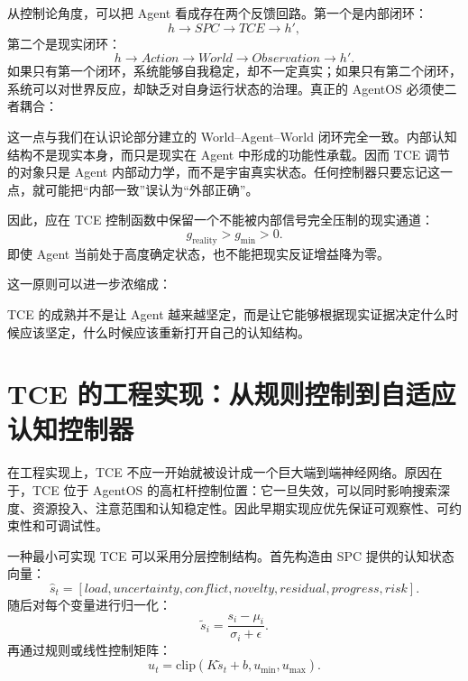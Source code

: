 从控制论角度，可以把 Agent 看成存在两个反馈回路。第一个是内部闭环：
\begin{equation}
    h
    \rightarrow
    SPC
    \rightarrow
    TCE
    \rightarrow
    h',
\end{equation}
第二个是现实闭环：
\begin{equation}
    h
    \rightarrow
    Action
    \rightarrow
    World
    \rightarrow
    Observation
    \rightarrow
    h'.
\end{equation}
如果只有第一个闭环，系统能够自我稳定，却不一定真实；如果只有第二个闭环，系统可以对世界反应，却缺乏对自身运行状态的治理。真正的 AgentOS 必须使二者耦合：
\begin{statementbox}
\centering
{}
\end{statementbox}

这一点与我们在认识论部分建立的 World--Agent--World 闭环完全一致。内部认知结构不是现实本身，而只是现实在 Agent 中形成的功能性承载。因而 TCE 调节的对象只是 Agent 内部动力学，而不是宇宙真实状态。任何控制器只要忘记这一点，就可能把“内部一致”误认为“外部正确”。

因此，应在 TCE 控制函数中保留一个不能被内部信号完全压制的现实通道：
\begin{equation}
    g_{\mathrm{reality}}>g_{\min}>0.
\end{equation}
即使 Agent 当前处于高度确定状态，也不能把现实反证增益降为零。

这一原则可以进一步浓缩成：
\begin{statementbox}
\centering
{}
\end{statementbox}
TCE 的成熟并不是让 Agent 越来越坚定，而是让它能够根据现实证据决定什么时候应该坚定，什么时候应该重新打开自己的认知结构。

\section{TCE 的工程实现：从规则控制到自适应认知控制器}

在工程实现上，TCE 不应一开始就被设计成一个巨大端到端神经网络。原因在于，TCE 位于 AgentOS 的高杠杆控制位置：它一旦失效，可以同时影响搜索深度、资源投入、注意范围和认知稳定性。因此早期实现应优先保证可观察性、可约束性和可调试性。

一种最小可实现 TCE 可以采用分层控制结构。首先构造由 SPC 提供的认知状态向量：
\begin{equation}
    \hat s_t=
    [
    load,
    uncertainty,
    conflict,
    novelty,
    residual,
    progress,
    risk
    ].
\end{equation}
随后对每个变量进行归一化：
\begin{equation}
    \tilde s_i
    =
    \frac{s_i-\mu_i}{\sigma_i+\epsilon}.
\end{equation}
再通过规则或线性控制矩阵：
\begin{equation}
    u_t
    =
    \mathrm{clip}
    \left(
    K\tilde s_t+b,
    u_{\min},
    u_{\max}
    \right).
\end{equation}

